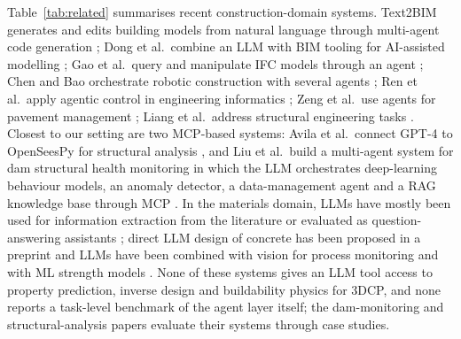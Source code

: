 \documentclass[preprint,12pt]{elsarticle}
\begin{document}
Table~\ref{tab:related} summarises recent construction-domain systems. Text2BIM generates and edits building models from natural language through multi-agent code generation \cite{du2026text2bim}; Dong et al.\ combine an LLM with BIM tooling for AI-assisted modelling \cite{dong2025aibim}; Gao et al.\ query and manipulate IFC models through an agent \cite{gao2026ifcagent}; Chen and Bao orchestrate robotic construction with several agents \cite{chen2025multiagentrc}; Ren et al.\ apply agentic control in engineering informatics \cite{ren2026agenticontrol}; Zeng et al.\ use agents for pavement management \cite{zeng2026pavementagents}; Liang et al.\ address structural engineering tasks \cite{liang2026llmstructural}. Closest to our setting are two MCP-based systems: Avila et al.\ connect GPT-4 to OpenSeesPy for structural analysis \cite{avila2025hai}, and Liu et al.\ build a multi-agent system for dam structural health monitoring in which the LLM orchestrates deep-learning behaviour models, an anomaly detector, a data-management agent and a RAG knowledge base through MCP \cite{liu2026llm4shm}. In the materials domain, LLMs have mostly been used for information extraction from the literature \cite{dagdelen2024structured,polak2024extracting,jablonka2023fourteen,li2026llmconcreteextraction} or evaluated as question-answering assistants \cite{li2024chatgptunderground}; direct LLM design of concrete has been proposed in a preprint \cite{volker2024llmconcrete} and LLMs have been combined with vision for process monitoring \cite{li2025concretevibrationllm} and with ML strength models \cite{zaman2026concretellm}. None of these systems gives an LLM tool access to property prediction, inverse design and buildability physics for 3DCP, and none reports a task-level benchmark of the agent layer itself; the dam-monitoring and structural-analysis papers evaluate their systems through case studies.
\end{document}

